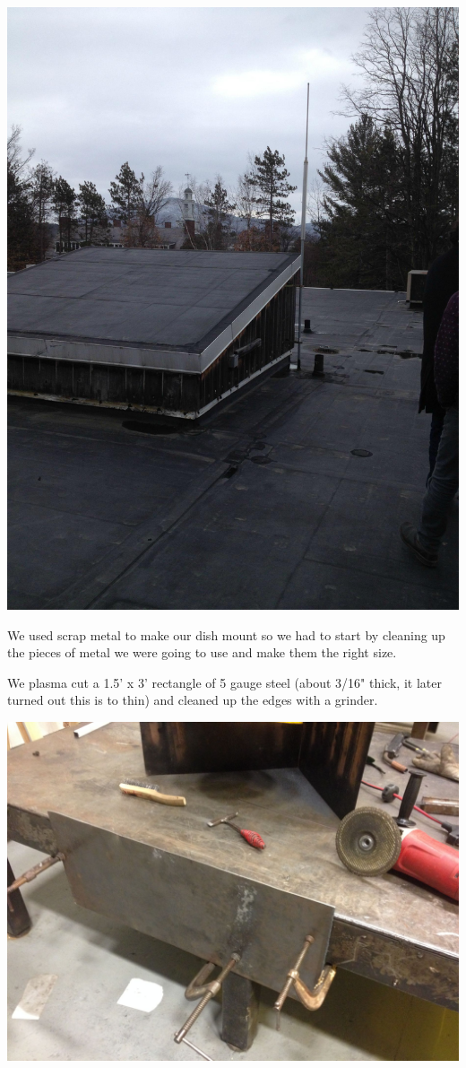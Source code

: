 \documentclass[11pt]{article} %
\begin{document}
\begin{center}
\includegraphics[scale=0.12]{roofmount/00.jpeg}
\end{center}

We used scrap metal to make our dish mount so we had to start by cleaning up the pieces of metal we were going to use and make them the right size.

We plasma cut a 1.5' x 3' rectangle of 5 gauge steel (about 3/16" thick, it later turned out this is to thin) and cleaned up the edges with a grinder.

\begin{center}
\includegraphics[scale=0.12]{roofmount/01.jpeg}
\end{center}
\end{document}
